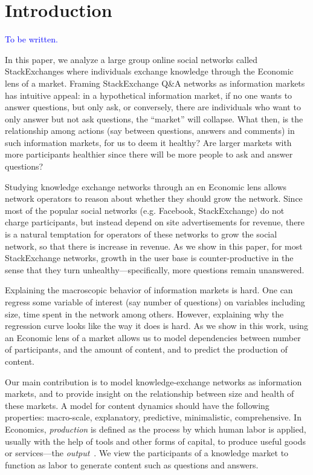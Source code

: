 \section{Introduction}
\textcolor{blue}{To be written.}


In this paper, we analyze a large group online social networks called StackExchanges where individuals exchange knowledge through the Economic lens of a market. Framing StackExchange Q\&A networks as information markets has intuitive appeal: in a hypothetical information market, if no one wants to answer questions, but only ask, or conversely, there are individuals who want to only answer but not ask questions, the ``market'' will collapse. What then, is the relationship among actions (say between questions, answers and comments) in such information markets, for us to deem it healthy? Are larger markets with more participants healthier since there will be more people to ask and answer questions?


Studying knowledge exchange networks through an en Economic lens allows network operators to reason about whether they should grow the network. Since most of the popular social networks (e.g. Facebook, StackExchange) do not charge participants, but instead depend on site advertisements for revenue, there is a natural temptation for operators of these networks to grow the social network, so that there is increase in revenue. As we show in this paper, for most StackExchange networks, growth in the user base is counter-productive in the sense that they turn unhealthy---specifically, more questions remain unanswered.

Explaining the macroscopic behavior of information markets is hard. One can regress some variable of interest (say number of questions) on variables including size, time spent in the network among others. However, explaining why the regression curve looks like the way it does is hard. As we show in this work, using an Economic lens of a market allows us to model dependencies between number of participants, and the amount of content, and to predict the production of content.


Our main contribution is to model knowledge-exchange networks as information markets, and to provide insight on the relationship between size and health of these markets. A model for content dynamics should have the following properties: macro-scale, explanatory, predictive, minimalistic, comprehensive. In Economics, \emph{production} is defined as the process by which human labor is applied, usually with the help of tools and other forms of capital, to produce useful goods or services---the \emph{output}~\cite{stanford2008economics}. We view the participants of a knowledge market to function as labor to generate content such as questions and answers.

